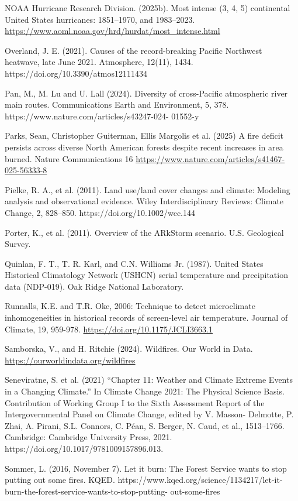 \documentclass[12pt,paper=a4,DIV=12,parskip=never,chapterprefix=false,headings=standardclasses]{scrreprt}
\begin{document}
NOAA Hurricane Research Division. (2025b). Most intense (3, 4, 5) continental United States
hurricanes: 1851–1970, and 1983–2023. \url{https://www.aoml.noaa.gov/hrd/hurdat/most_intense.html}

Overland, J. E. (2021). Causes of the record-breaking Pacific Northwest heatwave, late June 2021.
Atmosphere, 12(11), 1434. https://doi.org/10.3390/atmos12111434

Pan, M., M. Lu and U. Lall (2024). Diversity of cross-Pacific atmospheric river main routes.
Communications Earth and Environment, 5, 378. https://www.nature.com/articles/s43247-024-
01552-y

Parks, Sean, Christopher Guiterman, Ellis Margolis et al. (2025) A fire deficit persists across diverse
North American forests despite recent increases in area burned. Nature Communications 16
\url{https://www.nature.com/articles/s41467-025-56333-8}

Pielke, R. A., et al. (2011). Land use/land cover changes and climate: Modeling analysis and
observational evidence. Wiley Interdisciplinary Reviews: Climate Change, 2, 828–850.
https://doi.org/10.1002/wcc.144

Porter, K., et al. (2011). Overview of the ARkStorm scenario. U.S. Geological Survey.

Quinlan, F. T., T. R. Karl, and C.N. Williams Jr. (1987). United States Historical Climatology Network
(USHCN) serial temperature and precipitation data (NDP-019). Oak Ridge National Laboratory.

Runnalls, K.E. and T.R. Oke, 2006: Technique to detect microclimate inhomogeneities in historical
records of screen-level air temperature. Journal of Climate, 19, 959-978.
\url{https://doi.org/10.1175/JCLI3663.1}

Samborska, V., and H. Ritchie (2024). Wildfires. Our World in Data. \url{https://ourworldindata.org/wildfires}

Seneviratne, S. et al. (2021) “Chapter 11: Weather and Climate Extreme Events in a Changing Climate.”
In Climate Change 2021: The Physical Science Basis. Contribution of Working Group I to the Sixth
Assessment Report of the Intergovernmental Panel on Climate Change, edited by V. Masson-
Delmotte, P. Zhai, A. Pirani, S.L. Connors, C. Péan, S. Berger, N. Caud, et al., 1513–1766.
Cambridge: Cambridge University Press, 2021. https://doi.org/10.1017/9781009157896.013.

Sommer, L. (2016, November 7). Let it burn: The Forest Service wants to stop putting out some fires.
KQED. https://www.kqed.org/science/1134217/let-it-burn-the-forest-service-wants-to-stop-putting-
out-some-fires
\end{document}
